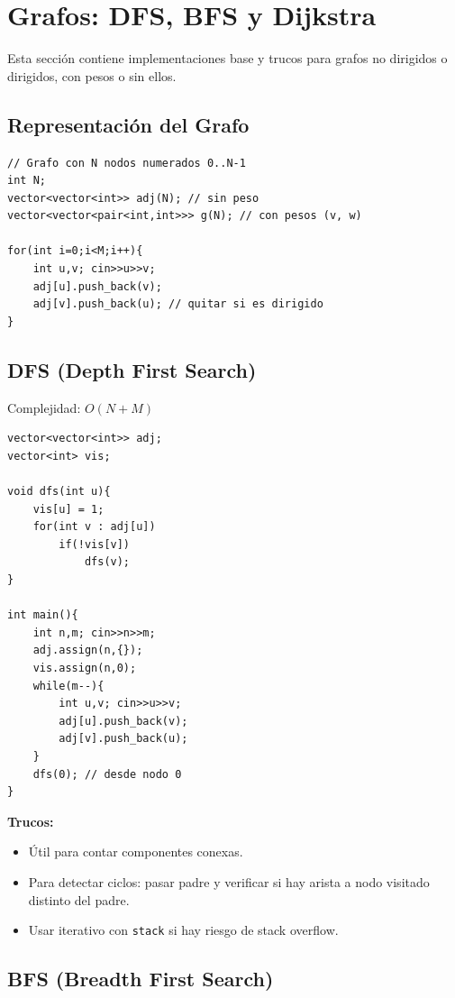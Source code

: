 \documentclass{article}
\begin{document}
\section{Grafos: DFS, BFS y Dijkstra}

Esta sección contiene implementaciones base y trucos para grafos no dirigidos o dirigidos, con pesos o sin ellos.

\subsection{Representación del Grafo}

\begin{lstlisting}[style=cppstyle]
// Grafo con N nodos numerados 0..N-1
int N;
vector<vector<int>> adj(N); // sin peso
vector<vector<pair<int,int>>> g(N); // con pesos (v, w)

for(int i=0;i<M;i++){
    int u,v; cin>>u>>v;
    adj[u].push_back(v);
    adj[v].push_back(u); // quitar si es dirigido
}
\end{lstlisting}


\subsection{DFS (Depth First Search)}

Complejidad: \(O(N + M)\)

\begin{lstlisting}[style=cppstyle]
vector<vector<int>> adj;
vector<int> vis;

void dfs(int u){
    vis[u] = 1;
    for(int v : adj[u])
        if(!vis[v])
            dfs(v);
}

int main(){
    int n,m; cin>>n>>m;
    adj.assign(n,{});
    vis.assign(n,0);
    while(m--){
        int u,v; cin>>u>>v;
        adj[u].push_back(v);
        adj[v].push_back(u);
    }
    dfs(0); // desde nodo 0
}
\end{lstlisting}

\textbf{Trucos:}
\begin{itemize}
  \item Útil para contar componentes conexas.
  \item Para detectar ciclos: pasar padre y verificar si hay arista a nodo visitado distinto del padre.
  \item Usar iterativo con \lstinline|stack| si hay riesgo de stack overflow.
\end{itemize}


\subsection{BFS (Breadth First Search)}
\end{document}
